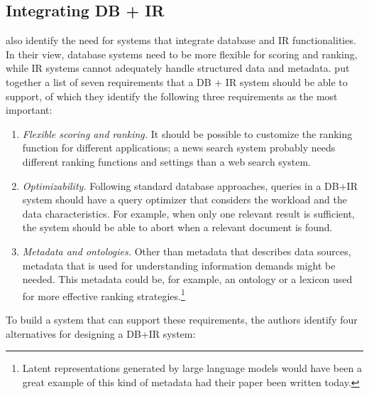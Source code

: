 \subsection{Integrating DB + IR}
 also identify the need for systems that integrate database and IR functionalities. In their view, database systems need to be more flexible for scoring and ranking, while IR systems cannot adequately handle structured data and metadata.  put together a list of seven requirements that a DB + IR system should be able to support, of which they identify the following three requirements as the most important:
\begin{enumerate}
	\item \emph{Flexible scoring and ranking.}
	It should be possible to customize the ranking function for different applications; a news search system probably needs different ranking functions and settings than a web search system. 
	\item \emph{Optimizability.}
	Following standard database approaches, queries in a DB+IR system should have a query optimizer that considers the workload and the data characteristics. For example, when only one relevant result is sufficient, the system should be able to abort when a relevant document is found. 
	\item \emph{Metadata and ontologies.}
	Other than metadata that describes data sources, metadata that is used for understanding information demands might be needed. This metadata could be, for example, an ontology or a lexicon used for more effective ranking strategies.\footnote{Latent representations generated by large language models would have been a great example of this kind of metadata had their paper been written today.}
\end{enumerate}
To build a system that can support these requirements, the authors identify four alternatives for designing a DB+IR system:

